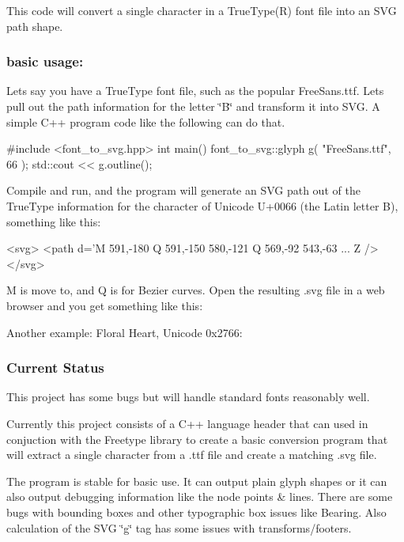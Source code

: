 This code will convert a single character in a True\+Type(\+R) font file into an S\+VG \textquotesingle{}path\textquotesingle{} shape.

\subsubsection*{basic usage\+:}

Let\textquotesingle{}s say you have a True\+Type font file, such as the popular Free\+Sans.\+ttf. Let\textquotesingle{}s pull out the path information for the letter \char`\"{}\+B\char`\"{} and transform it into S\+VG. A simple C++ program code like the following can do that. \begin{DoxyVerb}#include <font_to_svg.hpp>
int main()
{
    font_to_svg::glyph g( "FreeSans.ttf", 66 );
    std::cout << g.outline();
}
\end{DoxyVerb}


Compile and run, and the program will generate an S\+VG path out of the True\+Type information for the character of Unicode U+0066 (the Latin letter B), something like this\+: \begin{DoxyVerb}<svg>
<path d='M 591,-180 Q 591,-150 580,-121 Q 569,-92 543,-63 ... Z />
</svg>
\end{DoxyVerb}


\textquotesingle{}M\textquotesingle{} is \textquotesingle{}move to\textquotesingle{}, and \textquotesingle{}Q\textquotesingle{} is for Bezier curves. Open the resulting .svg file in a web browser and you get something like this\+:



Another example\+: Floral Heart, Unicode 0x2766\+:



\subsubsection*{Current Status}

This project has some bugs but will handle \textquotesingle{}standard\textquotesingle{} fonts reasonably well.

Currently this project consists of a C++ language header that can used in conjuction with the Freetype library to create a basic conversion program that will extract a single character from a .ttf file and create a matching .svg file.

The program is stable for basic use. It can output plain glyph shapes or it can also output \textquotesingle{}debugging\textquotesingle{} information like the node points \& lines. There are some bugs with bounding boxes and other \textquotesingle{}typographic box\textquotesingle{} issues like Bearing. Also calculation of the S\+VG \char`\"{}g\char`\"{} tag has some issues with transforms/footers.

